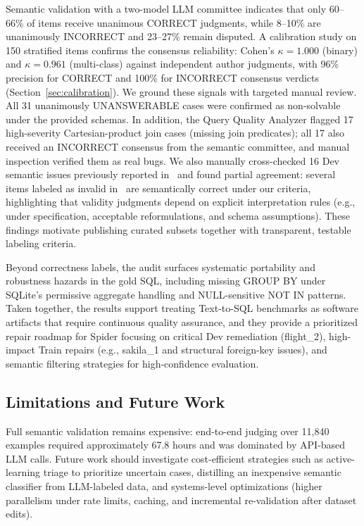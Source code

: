 \documentclass[print]{einformatica}
\begin{document}
Semantic validation with a two-model LLM committee indicates that only 60--66\% of items receive unanimous CORRECT judgments, while 8--10\% are unanimously INCORRECT and 23--27\% remain disputed. A calibration study on 150 stratified items confirms the consensus reliability: Cohen's $\kappa = 1.000$ (binary) and $\kappa = 0.961$ (multi-class) against independent author judgments, with 96\% precision for CORRECT and 100\% for INCORRECT consensus verdicts (Section~\ref{sec:calibration}). We ground these signals with targeted manual review. All 31 unanimously UNANSWERABLE cases were confirmed as non-solvable under the provided schemas. In addition, the Query Quality Analyzer flagged 17 high-severity Cartesian-product join cases (missing join predicates); all 17 also received an INCORRECT consensus from the semantic committee, and manual inspection verified them as real bugs. We also manually cross-checked 16 Dev semantic issues previously reported in~\cite{liu2025nl2sqlbugs} and found partial agreement: several items labeled as invalid in~\cite{liu2025nl2sqlbugs} are semantically correct under our criteria, highlighting that validity judgments depend on explicit interpretation rules (e.g., under specification, acceptable reformulations, and schema assumptions). These findings motivate publishing curated subsets together with transparent, testable labeling criteria.

Beyond correctness labels, the audit surfaces systematic portability and robustness hazards in the gold SQL, including missing GROUP BY under SQLite's permissive aggregate handling and NULL-sensitive NOT IN patterns. Taken together, the results support treating Text-to-SQL benchmarks as software artifacts that require continuous quality assurance, and they provide a prioritized repair roadmap for Spider focusing on critical Dev remediation (flight\_2), high-impact Train repairs (e.g., sakila\_1 and structural foreign-key issues), and semantic filtering strategies for high-confidence evaluation.

\subsection{Limitations and Future Work}

Full semantic validation remains expensive: end-to-end judging over 11,840 examples required approximately 67.8 hours and was dominated by API-based LLM calls. Future work should investigate cost-efficient strategies such as active-learning triage to prioritize uncertain cases, distilling an inexpensive semantic classifier from LLM-labeled data, and systems-level optimizations (higher parallelism under rate limits, caching, and incremental re-validation after dataset edits). 
\end{document}
